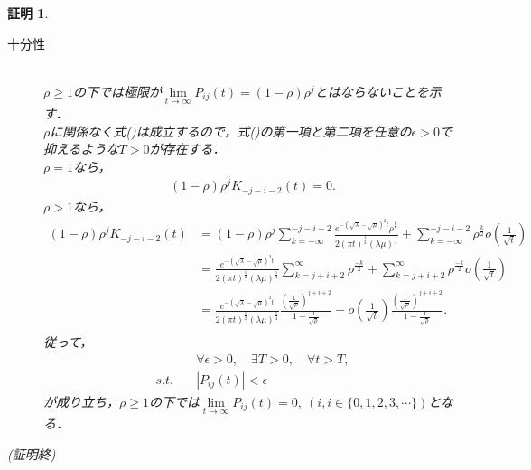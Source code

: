 \documentclass[a4j,papersize,disablejfam,slide,14pt]{jsarticle}
\newtheorem{Proof}{証明}
\def\qed{{(証明終)}} %
\def\exp#1{e^{#1}} %
\begin{document}
\begin{Proof}
\begin{description}
            \item[十分性]\mbox{}\\
            	$\rho \geq 1$の下では極限が$\lim\limits_{t \to \infty} P_{ij}(t) = (1-\rho)\rho^j$とはならないことを示す．\\
                $\rho$に関係なく式()は成立するので，式()の第一項と第二項を任意の$\epsilon > 0$で抑えるような$T > 0$が存在する．\\
                $\rho=1$なら，
                \begin{align}
                	(1-\rho)\rho^j K_{-j-i-2}(t) = 0.
                \end{align}
                $\rho>1$なら，
                \begin{align}
                	(1-\rho)\rho^j K_{-j-i-2}(t) &= (1-\rho)\rho^j \sum_{k=-\infty}^{-j-i-2} \frac{ \exp{-(\sqrt{\lambda}-\sqrt{\mu})^2 t} \rho^\frac{k}{2} }{ 2(\pi t)^\frac{1}{2} (\lambda \mu)^\frac{1}{4} } 
                    	+ \sum_{k=-\infty}^{-j-i-2} \rho^\frac{k}{2} o\left( \frac{1}{\sqrt{t}} \right) \\
                    &= \frac{ \exp{-(\sqrt{\lambda}-\sqrt{\mu})^2 t} }{ 2(\pi t)^\frac{1}{2} (\lambda \mu)^\frac{1}{4} } \sum_{k=j+i+2}^{\infty} \rho^\frac{-k}{2}
                    	+ \sum_{k=j+i+2}^{\infty} \rho^\frac{-k}{2} o\left( \frac{1}{\sqrt{t}} \right) \\
                    &= \frac{ \exp{-(\sqrt{\lambda}-\sqrt{\mu})^2 t} }{ 2(\pi t)^\frac{1}{2} (\lambda \mu)^\frac{1}{4} } \frac{ \left( \frac{1}{\sqrt{\rho}} \right)^{j+i+2} }{1 - \frac{1}{\sqrt{\rho}}}
                    	+ o\left( \frac{1}{\sqrt{t}} \right) \frac{ \left( \frac{1}{\sqrt{\rho}} \right)^{j+i+2} }{1 - \frac{1}{\sqrt{\rho}}}. \\
                \end{align}
                従って，
                \begin{align}
                	&\forall \epsilon > 0,\quad \exists T > 0,\quad \forall t > T, \\
                	s.t.\quad& \left| P_{ij}(t) \right| < \epsilon
                \end{align}
                が成り立ち，$\rho \geq 1$の下では$\lim\limits_{t \to \infty} P_{ij}(t) = 0,\ (i,i \in \{ 0,1,2,3,\cdots \})$となる．
        \end{description}
    	\qed
    \end{Proof}
\end{document}
